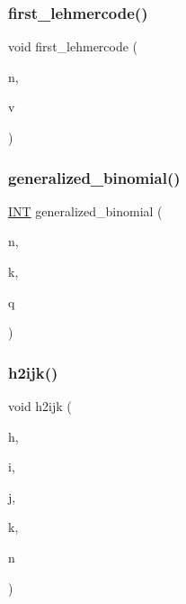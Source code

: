 \subsubsection{\texorpdfstring{first\+\_\+lehmercode()}{first\_lehmercode()}}
{\footnotesize\ttfamily void first\+\_\+lehmercode (\begin{DoxyParamCaption}\item[{\mbox{\hyperlink{galois_8h_a09fddde158a3a20bd2dcadb609de11dc}{I\+NT}}}]{n,  }\item[{\mbox{\hyperlink{galois_8h_a09fddde158a3a20bd2dcadb609de11dc}{I\+NT}} $\ast$}]{v }\end{DoxyParamCaption})}

\mbox{\label{combinatorics_8_c_a24762dc22e45175d18ec1ec1d2556ae8}} 
\subsubsection{\texorpdfstring{generalized\+\_\+binomial()}{generalized\_binomial()}}
{\footnotesize\ttfamily \mbox{\hyperlink{galois_8h_a09fddde158a3a20bd2dcadb609de11dc}{I\+NT}} generalized\+\_\+binomial (\begin{DoxyParamCaption}\item[{\mbox{\hyperlink{galois_8h_a09fddde158a3a20bd2dcadb609de11dc}{I\+NT}}}]{n,  }\item[{\mbox{\hyperlink{galois_8h_a09fddde158a3a20bd2dcadb609de11dc}{I\+NT}}}]{k,  }\item[{\mbox{\hyperlink{galois_8h_a09fddde158a3a20bd2dcadb609de11dc}{I\+NT}}}]{q }\end{DoxyParamCaption})}

\mbox{\label{combinatorics_8_c_a44083a67285a4c3c6994e17ea3a3b253}} 
\subsubsection{\texorpdfstring{h2ijk()}{h2ijk()}}
{\footnotesize\ttfamily void h2ijk (\begin{DoxyParamCaption}\item[{\mbox{\hyperlink{galois_8h_a09fddde158a3a20bd2dcadb609de11dc}{I\+NT}}}]{h,  }\item[{\mbox{\hyperlink{galois_8h_a09fddde158a3a20bd2dcadb609de11dc}{I\+NT}} \&}]{i,  }\item[{\mbox{\hyperlink{galois_8h_a09fddde158a3a20bd2dcadb609de11dc}{I\+NT}} \&}]{j,  }\item[{\mbox{\hyperlink{galois_8h_a09fddde158a3a20bd2dcadb609de11dc}{I\+NT}} \&}]{k,  }\item[{\mbox{\hyperlink{galois_8h_a09fddde158a3a20bd2dcadb609de11dc}{I\+NT}}}]{n }\end{DoxyParamCaption})}

